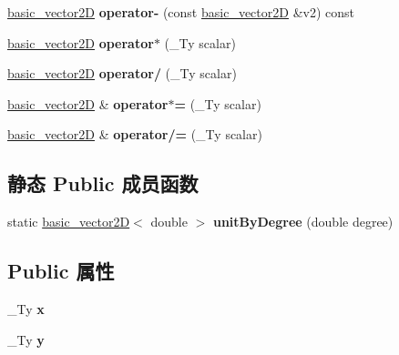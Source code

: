 \begin{DoxyCompactItemize}
\mbox{\label{structbasic__vector2_d_a7d335c93ec37013c5d4804bd721a04ac}} 
\hyperlink{structbasic__vector2_d}{basic\+\_\+vector2D} {\bfseries operator-\/} (const \hyperlink{structbasic__vector2_d}{basic\+\_\+vector2D} \&v2) const
\item 
\mbox{\label{structbasic__vector2_d_a749249ddf6d61699428d2dee790dfd9a}} 
\hyperlink{structbasic__vector2_d}{basic\+\_\+vector2D} {\bfseries operator$\ast$} (\+\_\+\+Ty scalar)
\item 
\mbox{\label{structbasic__vector2_d_a13a6172f8b5e7308964a372ed57a794b}} 
\hyperlink{structbasic__vector2_d}{basic\+\_\+vector2D} {\bfseries operator/} (\+\_\+\+Ty scalar)
\item 
\mbox{\label{structbasic__vector2_d_aab570d392ff446a6e16f6ca648ee65c6}} 
\hyperlink{structbasic__vector2_d}{basic\+\_\+vector2D} \& {\bfseries operator$\ast$=} (\+\_\+\+Ty scalar)
\item 
\mbox{\label{structbasic__vector2_d_ac608e28b6dc06bfeb28236e44bf850d0}} 
\hyperlink{structbasic__vector2_d}{basic\+\_\+vector2D} \& {\bfseries operator/=} (\+\_\+\+Ty scalar)
\end{DoxyCompactItemize}
\subsection*{静态 Public 成员函数}
\begin{DoxyCompactItemize}
\item 
\mbox{\label{structbasic__vector2_d_aa31b5b9b9261d28ecd2626ba38b61278}} 
static \hyperlink{structbasic__vector2_d}{basic\+\_\+vector2D}$<$ double $>$ {\bfseries unit\+By\+Degree} (double degree)
\end{DoxyCompactItemize}
\subsection*{Public 属性}
\begin{DoxyCompactItemize}
\item 
\mbox{\label{structbasic__vector2_d_a9f606d50a5993d8c8f3834e67e2e750d}} 
\+\_\+\+Ty {\bfseries x}
\item 
\mbox{\label{structbasic__vector2_d_ad874ba527147096c9ee6c56ded52be73}} 
\+\_\+\+Ty {\bfseries y}
\end{DoxyCompactItemize}
